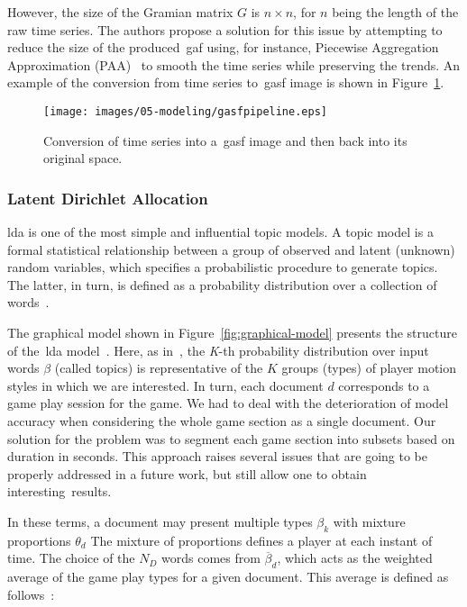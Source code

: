 However, the size of the Gramian matrix $G$ is $n \times n$, for $n$ being the length of the raw time series. The authors propose a solution for this issue by attempting to reduce the size of the produced~\gls{gaf} using, for instance, Piecewise Aggregation Approximation (PAA)~\cite{keogh_scaling_2000} to smooth the time series while preserving the trends. An example of the conversion from time series to~\gls{gasf} image is shown in Figure~\ref{figure:gasf_example}.

\begin{figure} [H]
\centering
\texttt{[image: images/05-modeling/gasfpipeline.eps]} 
 \caption{Conversion of time series into a~\gls{gasf} image and then back into its original space.}
 \label{figure:gasf_example}
\end{figure}

\subsubsection{Latent Dirichlet Allocation}
\glsdesc{lda} is one of the most simple and influential topic models. {A topic model is a formal statistical relationship between a group of observed and latent (unknown) random variables, which specifies a probabilistic procedure to generate topics. The latter, in turn, is defined as a probability distribution over a collection of words}~\citep{reed_latent_2012}.

The graphical model shown in Figure~\ref{fig:graphical-model} presents the structure of the~\gls{lda} model~\cite{blei_latent_2003}. Here, as in~\cite{smith_mining_2016}, the \textit{K}-th probability distribution over input words $\beta$ (called topics) is representative of the $K$ groups (types) of player motion styles in which we are interested. In turn, each document $d$ corresponds to a {game play} session for the game. We had to deal with the deterioration of model accuracy when considering the whole game section as a single document. Our solution for the problem was to segment each game section into subsets based on duration in seconds. %
This approach raises several issues that are going to be properly addressed in a future work, but still allow one to obtain interesting~results. %

%
In these terms, a document may present multiple types $\beta_{k}$ with mixture proportions $\theta_{d}$ The mixture of proportions defines a player at each instant of time. The choice of the $N_{D}$ words comes from $\overline{\beta}_{d}$, which acts as the weighted average of the game play types for a given document. This average is defined as follows~\cite{blei_latent_2003,smith_mining_2016}:

